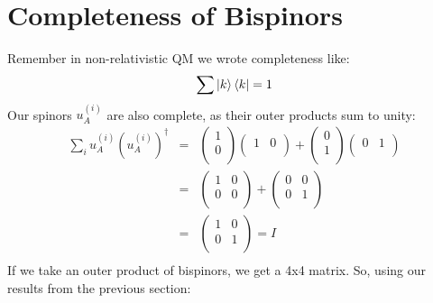 \documentclass[12pt]{book}
\begin{document}
\section{Completeness of Bispinors}

Remember in non-relativistic QM we wrote completeness like:
$$\sum \ket{k} \bra{k} = 1$$
Our spinors $u_A^{(i)}$ are also complete, as their outer products sum to unity:
\begin{eqnarray*}
\sum_i u_A^{(i)} (u_A^{(i)})^\dagger &=& 
\begin{pmatrix} 1 \\ 0 \\ \end{pmatrix}
\begin{pmatrix} 1 & 0 \\\end{pmatrix}
+
\begin{pmatrix} 0 \\ 1 \\ \end{pmatrix}
\begin{pmatrix} 0 & 1 \\\end{pmatrix}\\
&=& \begin{pmatrix} 1 & 0 \\ 0 & 0 \\ \end{pmatrix}
+ \begin{pmatrix} 0 & 0 \\ 0 & 1 \\ \end{pmatrix}\\
&=& \begin{pmatrix} 1 & 0 \\ 0 & 1 \\ \end{pmatrix} = I\\ 
\end{eqnarray*}
If we take an outer product of bispinors, we get a 4x4 matrix.  So, using our results from the previous section:
\end{document}
